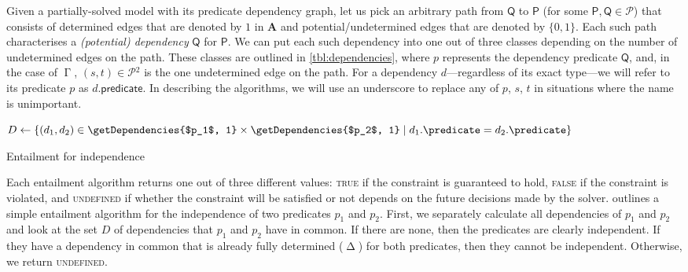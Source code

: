 \documentclass[runningheads]{llncs}
\newcommand{\predicates}{\mathcal{P}}
\DeclareMathOperator{\Determined}{\Delta}
\DeclareMathOperator{\AlmostDetermined}{\Gamma}
\begin{document}
Given a partially-solved model with its predicate dependency graph, let us pick
an arbitrary path from $\mathsf{Q}$ to $\mathsf{P}$ (for some $\mathsf{P},
\mathsf{Q} \in \predicates{}$) that consists of determined edges that are
denoted by $1$ in $\mathbf{A}$ and potential/undetermined edges that are
denoted by $\{ 0, 1 \}$. Each such path characterises a \emph{(potential)
  dependency} $\mathsf{Q}$ for $\mathsf{P}$. We can put each such dependency
into one out of three classes depending on the number of undetermined edges on
the path. These classes are outlined in \cref{tbl:dependencies}, where $p$
represents the dependency predicate $\mathsf{Q}$, and, in the case of
$\AlmostDetermined{}$, $(s, t) \in \predicates{}^2$ is the one undetermined edge
on the path. For a dependency $d$---regardless of its exact type---we will refer
to its predicate $p$ as $d.\mathsf{predicate}$. In describing the algorithms, we
will use an underscore to replace any of $p$, $s$, $t$ in situations where the
name is unimportant.

\begin{algorithm}[t]
  $D \gets \{ (d_1, d_2) \in \getDependencies{$p_1$, 1} \times
  \getDependencies{$p_2$, 1} \mid d_1.\predicate = d_2.\predicate \}$\;
  \leIf{$\exists (\Determined \_, \Determined \_) \in
    D$}{\Return{\textsc{false}}}{\Return{\textsc{undefined}}}
  \caption{Entailment for independence}
  \label{alg:independence_entailment}
\end{algorithm}

Each entailment algorithm returns one out of three different values:
\textsc{true} if the constraint is guaranteed to hold, \textsc{false} if the
constraint is violated, and \textsc{undefined} if whether the constraint will be
satisfied or not depends on the future decisions made by the solver.
 outlines a simple entailment algorithm for
the independence of two predicates $p_1$ and $p_2$. First, we separately
calculate all dependencies of $p_1$ and $p_2$ and look at the set $D$ of
dependencies that $p_1$ and $p_2$ have in common. If there are none, then the
predicates are clearly independent. If they have a dependency in common that is
already fully determined ($\Determined$) for both predicates, then they cannot be
independent. Otherwise, we return \textsc{undefined}.
\end{document}
